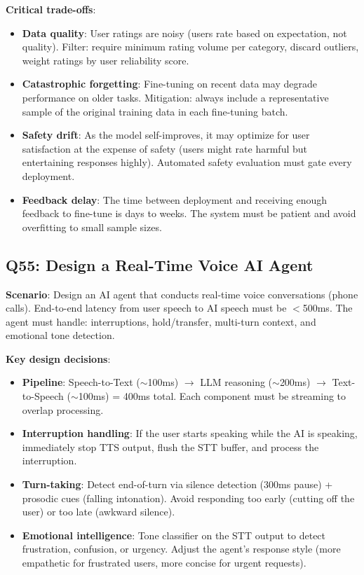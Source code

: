 \textbf{Critical trade-offs}:
\begin{itemize}[leftmargin=*]
    \item \textbf{Data quality}: User ratings are noisy (users rate based on expectation, not quality). Filter: require minimum rating volume per category, discard outliers, weight ratings by user reliability score.
    \item \textbf{Catastrophic forgetting}: Fine-tuning on recent data may degrade performance on older tasks. Mitigation: always include a representative sample of the original training data in each fine-tuning batch.
    \item \textbf{Safety drift}: As the model self-improves, it may optimize for user satisfaction at the expense of safety (users might rate harmful but entertaining responses highly). Automated safety evaluation must gate every deployment.
    \item \textbf{Feedback delay}: The time between deployment and receiving enough feedback to fine-tune is days to weeks. The system must be patient and avoid overfitting to small sample sizes.
\end{itemize}

\subsection{Q55: Design a Real-Time Voice AI Agent}

\textbf{Scenario}: Design an AI agent that conducts real-time voice conversations (phone calls). End-to-end latency from user speech to AI speech must be $<$500ms. The agent must handle: interruptions, hold/transfer, multi-turn context, and emotional tone detection.

\textbf{Key design decisions}:
\begin{itemize}[leftmargin=*]
    \item \textbf{Pipeline}: Speech-to-Text ($\sim$100ms) $\to$ LLM reasoning ($\sim$200ms) $\to$ Text-to-Speech ($\sim$100ms) = 400ms total. Each component must be streaming to overlap processing.
    \item \textbf{Interruption handling}: If the user starts speaking while the AI is speaking, immediately stop TTS output, flush the STT buffer, and process the interruption.
    \item \textbf{Turn-taking}: Detect end-of-turn via silence detection (300ms pause) + prosodic cues (falling intonation). Avoid responding too early (cutting off the user) or too late (awkward silence).
    \item \textbf{Emotional intelligence}: Tone classifier on the STT output to detect frustration, confusion, or urgency. Adjust the agent's response style (more empathetic for frustrated users, more concise for urgent requests).
\end{itemize}

